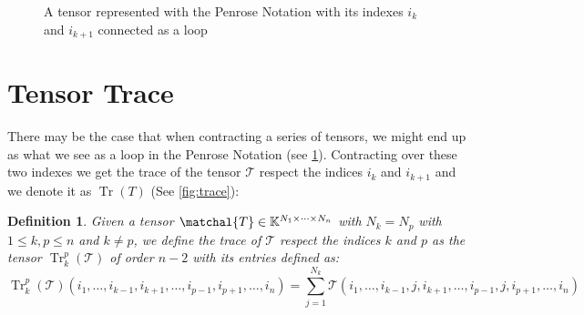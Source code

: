 \documentclass[11pt,a4paper,openright,oneside]{book}
\numberwithin{equation}{section}
\newtheorem{defn0}{Definition}[chapter]
\newenvironment{definition}{ \begin{defn0}}{\end{defn0}}
\newcommand{\figref}[1]{\cref{#1}}
\DeclareMathOperator{\Tr}{Tr}
\begin{document}
\begin{figure}
\centering
{}
\caption{
    A tensor represented with the Penrose Notation with its indexes $i_k$ and $i_{k+1}$ connected as a loop
}
\label{fig:loop}
\end{figure}

\section{Tensor Trace}

There may be the case that when contracting a series of tensors, we might end up as what
we see as a loop in the Penrose Notation (see \figref{fig:loop}). Contracting over these two indexes we get the trace
of the tensor $\mathcal{T}$ respect the indices $i_k$ and $i_{k+1}$ and we denote it as $\Tr(T)$ (See \figref{fig:trace}):

\begin{definition}
    Given a tensor $\matchal{T} \in \mathbb{K}^{N_1 \times \cdots \times N_n}$ with $N_k = N_p$ with $1 \leqslant k, p \leqslant n$ and $k \neq p$,
    we define the trace of $\mathcal{T}$ respect the indices $k$ and $p$ as the tensor $\Tr_k^p(\mathcal{T})$ of order $n - 2$ with its entries defined as:
    $$\Tr_k^p(\mathcal{T}) (i_1, \dots, i_{k-1}, i_{k+1}, \dots, i_{p-1}, i_{p+1}, \dots, i_n) = \sum_{j = 1}^{N_k} \mathcal{T}(i_1, \dots, i_{k-1}, j, i_{k+1}, \dots, i_{p-1}, j, i_{p+1}, \dots, i_n)$$

\end{definition}
\end{document}
